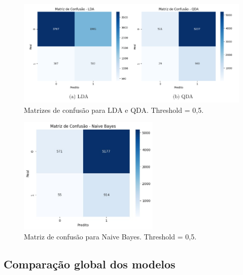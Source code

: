 \documentclass[english, spanish, brazilian]{RBIEarticle} %
\begin{document}
\begin{figure}[H]\centering
    \includegraphics[width=1\textwidth]{images/matrizes-confusao-lda-qda.png}
    \caption{Matrizes de confusão para LDA e QDA. Threshold = 0{,}5.}
    \label{fig:cms-d}
\end{figure}

\begin{figure}[htbp]\centering
	\includegraphics[width=0.6\textwidth]{images/matriz-confusao-naive-bayes.jpeg}
	\caption{Matriz de confusão para Naive Bayes. Threshold = 0{,}5.}
	\label{fig:cms-nb}
\end{figure}


\subsection{Comparação global dos modelos}
\end{document}
